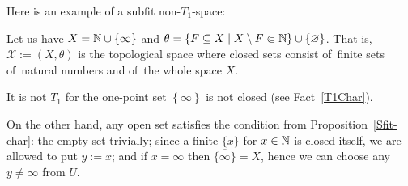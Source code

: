 Here is an example of a subfit non-$T_1$-space:

\begin{exmpl}
  Let us have $X = \mathbb{N} \cup \left\{\infty\right\}$ and $\theta = \left\{
  F\subseteq X \mid X\setminus F \Subset \mathbb{N} \right\} \cup \left\{ \varnothing
  \right\}$.
  That is, $\mathcal{X} := (X, \theta)$ is the topological space where closed
  sets consist of~finite sets of~natural numbers and of~the whole space $X$.

  It is not $T_1$ for the one-point set $\left\{ \infty \right\}$ is not
  closed (see Fact~\ref{T1Char}).

  On the other hand, any open set satisfies the condition from
  Proposition~\ref{Sfit-char}:
  the empty set trivially;
  since a finite $\{x\}$ for $x\in \mathbb{N}$ is closed itself, we are allowed to
  put $y := x$;
  and if $x = \infty$ then $\overline{\{ \infty \}} = X$, hence we can choose
  any $y \ne \infty$ from $U$.
\end{exmpl}

